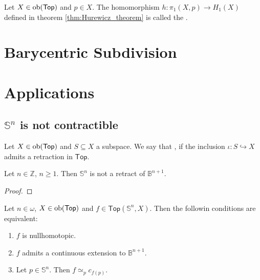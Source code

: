 \begin{definition}
	Let $X \in \operatorname{ob}(\mathsf{Top})$ and $p \in X$. The homomorphism $h : \pi_1(X,p) \to H_1(X)$ defined in theorem \ref{thm:Hurewicz_theorem} is called the .
\end{definition}

\section*{Barycentric Subdivision}



\section*{Applications}
\subsection*{$\mathbb{S}^n$ is not contractible}

\begin{definition}[Retract]
	Let $X \in \operatorname{ob}(\mathsf{Top})$ and $S \subseteq X$ a subspace. We say that ,  if the inclusion $\iota : S \hookrightarrow X$ admits a retraction in $\mathsf{Top}$.
\end{definition}

\begin{lemma}
	Let $n \in \mathbb{Z}$, $n \geq 1$. Then $\mathbb{S}^n$ is not a retract of $\mathbb{B}^{n + 1}$. 	
\end{lemma}

\begin{proof}
	
\end{proof}

\begin{proposition}
	Let $n \in \omega$, $X \in \operatorname{ob}(\mathsf{Top})$ and $f \in \mathsf{Top}(\mathbb{S}^n,X)$. Then the followin conditions are equivalent:
	\begin{enumerate}[label = \textup{(}\alph*\textup{)},wide = 0pt]
		\item $f$ is nullhomotopic.
		\item $f$ admits a continuous extension to $\mathbb{B}^{n+1}$.
		\item Let $p \in \mathbb{S}^n$. Then $f \simeq_p c_{f(p)}$.
	\end{enumerate}
\end{proposition}

